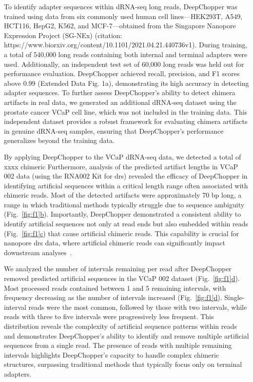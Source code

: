 \documentclass[pdflatex,sn-nature, lineno]{sn-jnl}%
\newcommand{\figref}[2]{Fig.~\hyperref[#1]{\ref*{#1}#2}}
\theoremstyle{thmstyleone}%
\theoremstyle{thmstyletwo}%
\theoremstyle{thmstylethree}%
\begin{document}
To identify adapter sequences within dRNA-seq long reads, DeepChopper was trained using data from six commonly used human cell lines—HEK293T, A549, HCT116, HepG2, K562, and MCF-7—obtained from the Singapore Nanopore Expression Project (SG-NEx) (citation: https://www.biorxiv.org/content/10.1101/2021.04.21.440736v1). During training, a total of 540,000 long reads containing both internal and terminal adapters were used. Additionally, an independent test set of 60,000 long reads was held out for performance evaluation. DeepChopper achieved recall, precision, and F1 scores above 0.99 (Extended Data Fig. 1a), demonstrating its high accuracy in detecting adapter sequences. To further assess DeepChopper’s ability to detect chimera artifacts in real data, we generated an additional dRNA-seq dataset using the prostate cancer VCaP cell line, which was not included in the training data. This independent dataset provides a robust framework for evaluating chimera artifacts in genuine dRNA-seq samples, ensuring that DeepChopper's performance generalizes beyond the training data. 

By applying DeepChopper to the VCaP dRNA-seq data, we detected a total of xxxx chimeric 
Furthermore, analysis of the predicted artifact lengths in VCaP 002 data (using the RNA002 Kit for \gls{drs}) revealed the efficacy of DeepChopper in identifying artificial sequences within a critical length range often associated with chimeric reads.
Most of the detected artifacts were approximately 70 bp long, a range in which traditional methods typically struggle due to sequence ambiguity (\figref{fig:f1}{b}).
Importantly, DeepChopper demonstrated a consistent ability to identify artificial sequences not only at read ends but also embedded within reads (\figref{fig:f1}{c}) that cause artificial chimeric reads.
This capability is crucial for nanopore \gls{drs} data, where artificial chimeric reads can significantly impact downstream analyses~\cite{smith2020molecular}.

We analyzed the number of intervals remaining per read after DeepChopper removed predicted artificial sequences in the VCaP 002 dataset (\figref{fig:f1}{d}). 
Most processed reads contained between 1 and 5 remaining intervals, with frequency decreasing as the number of intervals increased (\figref{fig:f1}{d}). 
Single-interval reads were the most common, followed by those with two intervals, while reads with three to five intervals were progressively less frequent.
This distribution reveals the complexity of artificial sequence patterns within reads and demonstrates DeepChopper's ability to identify and remove multiple artificial sequences from a single read. 
The presence of reads with multiple remaining intervals highlights DeepChopper's capacity to handle complex chimeric structures, surpassing traditional methods that typically focus only on terminal adapters.
\end{document}
